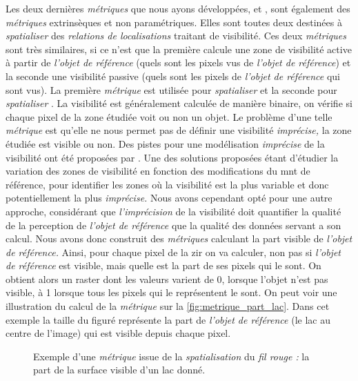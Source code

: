 Les deux dernières \emph{métriques} que nous ayons développées,
 et , sont également des
\emph{métriques} extrinsèques et non paramétriques. Elles sont toutes
deux destinées à \emph{spatialiser} des \emph{relations de
  localisations} traitant de visibilité. Ces deux \emph{métriques}
sont très similaires, si ce n'est que la première calcule une zone de
visibilité active à partir de \emph{l'objet de référence} (\ie quels
sont les pixels vus de \emph{l'objet de référence}) et la seconde une
visibilité passive (\ie quels sont les pixels de \emph{l'objet de
  référence} qui sont vus). La première \emph{métrique} est utilisée
pour \emph{spatialiser}  et la seconde
pour \emph{spatialiser} . La visibilité
est généralement calculée de manière binaire, on vérifie si chaque
pixel de la zone étudiée voit ou non un objet. Le problème d'une telle
\emph{métrique} est qu'elle ne nous permet pas de définir une
visibilité \emph{imprécise,} la zone étudiée est visible ou non. Des
pistes pour une modélisation \emph{imprécise} de la visibilité ont été
proposées par \textcite{}. Une des solutions proposées étant d'étudier
la variation des zones de visibilité en fonction des modifications du
\ac{mnt} de référence, pour identifier les zones où la visibilité est
la plus variable et donc potentiellement la plus \emph{imprécise.}
Nous avons cependant opté pour une autre approche, considérant que
\emph{l'imprécision} de la visibilité doit quantifier la qualité de la
perception de \emph{l'objet de référence} que la qualité des données
servant a son calcul. Nous avons donc construit des \emph{métriques}
calculant la part visible de \emph{l'objet de référence.} Ainsi, pour
chaque pixel de la \ac{zir} on va calculer, non pas si \emph{l'objet
  de référence} est visible, mais quelle est la part de ses pixels qui
le sont. On obtient alors un raster dont les valeurs varient de 0,
lorsque l'objet n'est pas visible, à 1 lorsque tous les pixels qui le
représentent le sont. On peut voir une illustration du calcul de la
\emph{métrique}  sur la
\autoref{fig:metrique_part_lac}. Dans cet exemple la taille du figuré
représente la part de \emph{l'objet de référence} (le lac au centre de
l'image) qui est visible depuis chaque pixel.

\begin{figure}
  \centering
  
  \caption{Exemple d'une \emph{métrique} issue de la
    \emph{spatialisation} du \emph{fil rouge :} la part de la surface
    visible d'un lac donné.}
  \label{fig:metrique_part_lac}
\end{figure}

